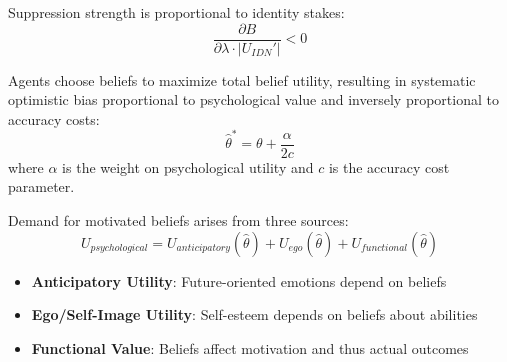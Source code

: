 \begin{tcolorbox}[colback=gray!5!white, colframe=gray!75!black, title=Axiom AWX-A06: Identity Stakes Proportionality]
Suppression strength is proportional to identity stakes:
\begin{equation}
\frac{\partial B}{\partial \lambda \cdot |U_{IDN}'|} < 0
\end{equation}
\end{tcolorbox}



\begin{tcolorbox}[colback=gray!5!white, colframe=gray!75!black, title=Axiom AWX-A82: Optimal Motivated Belief]
Agents choose beliefs to maximize total belief utility, resulting in systematic 
optimistic bias proportional to psychological value and inversely proportional 
to accuracy costs:
\begin{equation}
\hat{\theta}^* = \theta + \frac{\alpha}{2c}
\end{equation}
where $\alpha$ is the weight on psychological utility and $c$ is the accuracy 
cost parameter.
\end{tcolorbox}

\begin{tcolorbox}[colback=gray!5!white, colframe=gray!75!black, title=Axiom AWX-A86: Three Sources of Belief Demand]
Demand for motivated beliefs arises from three sources:
\begin{equation}
U_{psychological} = U_{anticipatory}(\hat{\theta}) + U_{ego}(\hat{\theta}) + U_{functional}(\hat{\theta})
\end{equation}
\begin{itemize}
    \item \textbf{Anticipatory Utility}: Future-oriented emotions depend on beliefs
    \item \textbf{Ego/Self-Image Utility}: Self-esteem depends on beliefs about abilities
    \item \textbf{Functional Value}: Beliefs affect motivation and thus actual outcomes
\end{itemize}
\end{tcolorbox}

